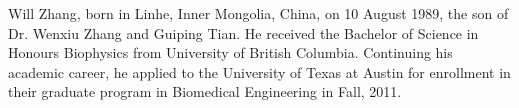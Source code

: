 \documentclass[12pt]{report}
\begin{document}
\listoftables      %
\listoffigures     %





%

% 












\appendices

%








\begin{vita}
Will Zhang, 
born in Linhe, Inner Mongolia, China, on 10 August 1989, 
the son of Dr. Wenxiu Zhang and Guiping Tian.  He received the Bachelor
of Science in Honours Biophysics from University of British Columbia.
Continuing his academic career, he applied to the University of Texas at Austin for enrollment in their graduate program in Biomedical Engineering in Fall, 2011.

\end{vita}
\end{document}
